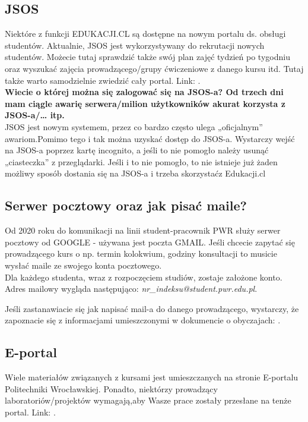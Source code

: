 \documentclass[11pt]{article}
\begin{document}
\subsection{JSOS}
\indent \hspace{0.5cm} Niektóre z funkcji EDUKACJI.CL są dostępne na nowym portalu ds. obsługi studentów. Aktualnie, JSOS jest wykorzystywany do rekrutacji nowych studentów. Możecie tutaj sprawdzić także swój plan zajęć tydzień po tygodniu oraz wyszukać zajęcia prowadzącego/grupy ćwiczeniowe z danego kursu itd. Tutaj także warto samodzielnie zwiedzić cały portal. Link: {}.\\
\indent \textbf{Wiecie o której można się zalogować się na JSOS-a? Od trzech dni mam ciągle awarię serwera/milion użytkowników akurat korzysta z JSOS-a/… itp.}\\
\indent JSOS jest nowym systemem, przez co bardzo często ulega „oficjalnym” awariom.\linebreak Pomimo tego i tak można uzyskać dostęp do JSOS-a. Wystarczy wejść na JSOS-a poprzez kartę incognito, a jeśli to nie pomogło należy usunąć „ciasteczka” z przeglądarki. Jeśli i to nie pomogło, to nie istnieje już żaden możliwy sposób dostania się na JSOS-a i trzeba skorzystać\linebreak z Edukacji.cl
\subsection{Serwer pocztowy oraz jak pisać maile?}
\indent \hspace{0.5cm} Od 2020 roku do komunikacji na linii student-pracownik PWR służy serwer pocztowy od GOOGLE - używana jest poczta GMAIL. Jeśli chcecie zapytać się prowadzącego kurs o np. termin kolokwium, godziny konsultacji to musicie wysłać maile ze swojego konta pocztowego.\\
\indent Dla każdego studenta, wraz z rozpoczęciem studiów, zostaje założone konto. Adres mailowy wygląda następująco: \textit{nr\_indeksu@student.pwr.edu.pl}. 

\indent Jeśli zastanawiacie się jak napisać mail-a do danego prowadzącego, wystarczy, że zapoznacie się z informacjami umieszczonymi w dokumencie o obyczajach: 
{}.
\subsection{E-portal}
\indent  \hspace{0.5cm} Wiele materiałów związanych z kursami jest umieszczanych na stronie E-portalu Politechniki Wrocławskiej. Ponadto, niektórzy prowadzący laboratoriów/projektów wymagają,\linebreak aby Wasze prace zostały przesłane na tenże portal. Link: 
{}.
\end{document}
